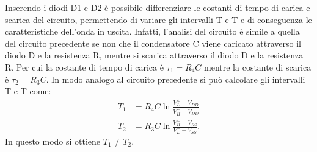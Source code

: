 Inserendo i diodi D1 e D2 è possibile differenziare le costanti di tempo di carica e scarica del circuito, permettendo di variare gli intervalli T e T e di conseguenza le caratteristiche dell'onda in uscita. Infatti, l'analisi del circuito è simile a quella del circuito precedente se non che il condensatore C viene caricato attraverso il diodo D e la resistenza R, mentre si scarica attraverso il diodo D e la resistenza R. Per cui la costante di tempo di carica è $\tau_1 = R_4C$ mentre la costante di scarica è $\tau_2=R_3C$. In modo analogo al circuito precedente si può calcolare gli intervalli T e T come:
\begin{equation}
	\begin{split}
		T_1&=R_4C \ln{\frac{V_L^+-V_{DD}}{V_H^+-V_{DD}}} \\
		T_2&=R_3C \ln{\frac{V_H^+-V_{SS}}{V_L^--V_{SS}}}.
	\end{split}
\end{equation}
In questo modo si ottiene $T_1 \ne T_2$.

